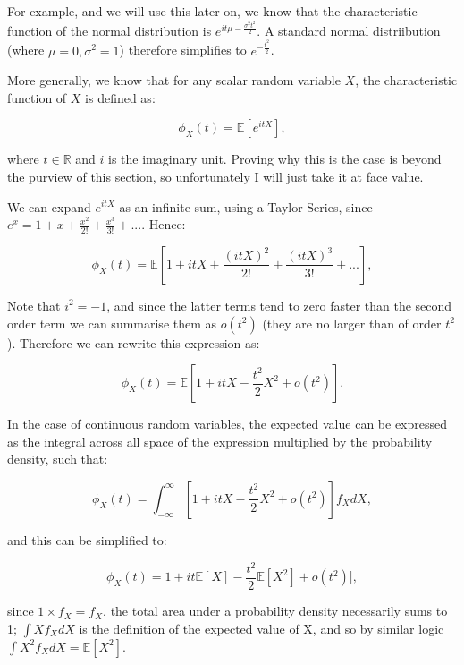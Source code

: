 \documentclass[
]{book}
\begin{document}
For example, and we will use this later on, we know that the characteristic function of the normal distribution is \(e^{it\mu-\frac{\sigma^{2}t^{2}}{2}}\). A standard normal distriibution (where \(\mu = 0, \sigma^2 = 1\)) therefore simplifies to \(e^{-\frac{t^{2}}{2}}\).

More generally, we know that for any scalar random variable \(X\), the characteristic function of \(X\) is defined as:

\begin{equation}
\phi_X(t) = \mathbb{E}[e^{itX}],
\end{equation}

where \(t \in \mathbb{R}\) and \(i\) is the imaginary unit. Proving why this is the case is beyond the purview of this section, so unfortunately I will just take it at face value.

We can expand \(e^{itX}\) as an infinite sum, using a Taylor Series, since \(e^x = 1 + x + \frac{x^2}{2!} + \frac{x^3}{3!} + ...\). Hence:

\begin{equation}
\phi_X(t) = \mathbb{E}[1 + itX + \frac{(itX)^2}{2!} + \frac{(itX)^3}{3!} + ... ],
\end{equation}

Note that \(i^2 = -1\), and since the latter terms tend to zero faster than the second order term we can summarise them as \(o(t^2)\) (they are no larger than of order \(t^2\)). Therefore we can rewrite this expression as:

\begin{equation}
\phi_X(t) = \mathbb{E}[1 + itX - \frac{t^2}{2}X^2 + o(t^2)].
\end{equation}

In the case of continuous random variables, the expected value can be expressed as the integral across all space of the expression multiplied by the probability density, such that:

\begin{equation}
\phi_X(t) = \int^{\infty}_{-\infty}[1 + itX - \frac{t^2}{2}X^2 + o(t^2)]f_X dX,
\end{equation}

and this can be simplified to:

\begin{equation}
\phi_X(t) = 1 + it\mathbb{E}[X] - \frac{t^2}{2}\mathbb{E}[X^2] + o(t^2)],
\end{equation}

since \(1 \times f_X = f_X\), the total area under a probability density necessarily sums to 1; \(\int Xf_X dX\) is the definition of the expected value of X, and so by similar logic \(\int X^2f_X dX = \mathbb{E}[X^2]\).
\end{document}
